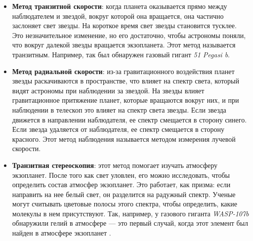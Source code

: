 \documentclass[14pt,a4paper]{extarticle}
\begin{document}
	\begin{itemize}
		\item \textbf{Метод транзитной скорости}: когда планета оказывается прямо между наблюдателем и звездой, вокруг которой она вращается, она частично заслоняет свет звезды. На короткое время свет звезды становится тусклее. Это незначительное изменение, но его достаточно, чтобы астрономы поняли, что вокруг далекой звезды вращается экзопланета. Этот метод называется транзитным. Например, так был обнаружен газовый гигант \textit{51 Pegasi b}. \cite{methods}
		\item \textbf{Метод радиальной скорости}: из-за гравитационного воздействия планет звезды раскачиваются в пространстве, что влияет на спектр света, который видят астрономы при наблюдении за звездой. На звезды влияет гравитационное притяжение планет, которые вращаются вокруг них, и при наблюдении в телескоп это влияет на спектр света звезды. Если звезда движется в направлении наблюдателя, ее спектр смещается в сторону синего. Если звезда удаляется от наблюдателя, ее спектр смещается в сторону красного. Этот метод наблюдения называется методом измерения лучевой скорости.
		\item \textbf{Транзитная стереоскопия}: этот метод помогает изучать атмосферу экзопланет. После того как свет уловлен, его можно исследовать, чтобы определить состав атмосфер экзопланет. Это работает, как призма: если направить на нее белый свет, он разделится на радужный спектр. Ученые могут считывать цветовые полосы этого спектра, чтобы определить, какие молекулы в нем присутствуют. Так, например, у газового гиганта \textit{WASP-107b} обнаружили гелий в атмосфере --- это первый случай, когда этот элемент был найден в атмосфере экзопланет \cite{methods}.
	\end{itemize}
	
\end{document}
